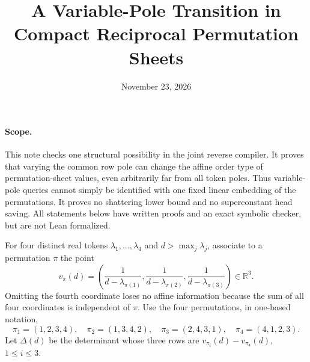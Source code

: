 \documentclass[11pt]{article}
\title{A Variable-Pole Transition in Compact Reciprocal Permutation Sheets}
\author{}
\date{November 23, 2026}
\begin{document}
\maketitle

\paragraph{Scope.}
This note checks one structural possibility in the joint reverse compiler.
It proves that varying the common row pole can change the affine order
type of permutation-sheet values, even arbitrarily far from all token
poles. Thus variable-pole queries cannot simply be identified with one
fixed linear embedding of the permutations. It proves no shattering
lower bound and no superconstant head saving. All statements below have
written proofs and an exact symbolic checker, but are not Lean formalized.

For four distinct real tokens $\lambda_1,\ldots,\lambda_4$ and
$d>\max_j\lambda_j$, associate to a permutation $\pi$ the point
\[
 v_\pi(d)=\left(\frac1{d-\lambda_{\pi(1)}},
                   \frac1{d-\lambda_{\pi(2)}},
                   \frac1{d-\lambda_{\pi(3)}}\right)\in\mathbb R^3.
\]
Omitting the fourth coordinate loses no affine information because the
sum of all four coordinates is independent of $\pi$.
Use the four permutations, in one-based notation,
\[
 \pi_1=(1,2,3,4),\quad \pi_2=(1,3,4,2),\quad
 \pi_3=(2,4,3,1),\quad \pi_4=(4,1,2,3).
\]
Let $\Delta(d)$ be the determinant whose three rows are
$v_{\pi_i}(d)-v_{\pi_4}(d)$, $1\leq i\leq3$.
\end{document}
